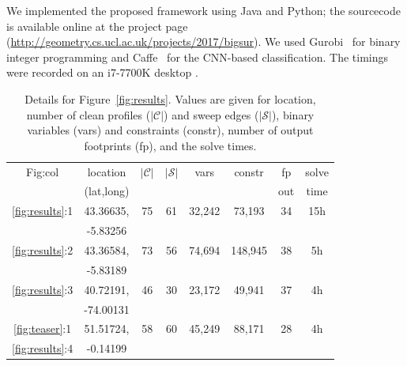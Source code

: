 We implemented the proposed framework using Java and Python; the sourcecode is available online at the project page (\url{http://geometry.cs.ucl.ac.uk/projects/2017/bigsur}). We used Gurobi~\cite{gurobi} for binary integer programming and Caffe~\cite{jia2014caffe} for the CNN-based classification. The timings were recorded on an i7-7700K desktop .

\begin{table}[b!]
\begin{center}
\caption{Details for Figure~\ref{fig:results}. 
Values are given for location, number of clean profiles ($|\mathcal{C}|$) and sweep edges ($|\mathcal{S}|$), binary variables (vars) and constraints (constr), number of output footprints (fp), and the solve times.}
\label{table:runtimes2}
\begin{tabular}{|c|c|c|c|c|c|c|c|} 
  \hline
  \small
 Fig:col & location & $|\mathcal{C}|$ & $|\mathcal{S}|$ & vars & constr & fp & solve\\
                    & (lat,long) &     &  &          &  & out & time \\
 \hline
 \hline
 \ref{fig:results}:1 & 43.36635, & 75 & 61 & 32,242 &73,193&34& 15h \\ 
   & -5.83256  &    &    &       &&&     \\
 \ref{fig:results}:2 & 43.36584, & 73 & 56 & 74,694 & 148,945 &38& 5h \\ 
 & -5.83189  &    &    &       &&&     \\
 \ref{fig:results}:3 & 40.72191, & 46 & 30 & 23,172 & 49,941 & 37& 4h \\ 
 & -74.00131  &    &    &       &&&   \\
 \ref{fig:teaser}:1 & 51.51724, & 58 & 60 & 45,249 &88,171&28& 4h \\ 
\ref{fig:results}:4 & -0.14199  &    &    &       &&&     \\
 \hline
 
 \end{tabular}
\end{center}
\end{table}

